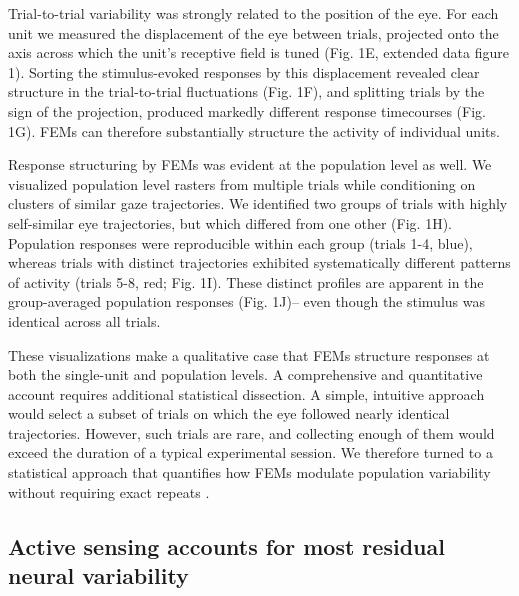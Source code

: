 \documentclass{lite}
\begin{document}
Trial-to-trial variability was strongly related to the position of the eye. For each unit we measured the displacement of the eye between trials, projected onto the axis across which the unit's receptive field is tuned (Fig. 1E, extended data figure 1). Sorting the stimulus-evoked responses by this displacement revealed clear structure in the trial-to-trial fluctuations (Fig. 1F), and splitting trials by the sign of the projection, produced markedly different response timecourses (Fig. 1G). FEMs can therefore substantially structure the activity of individual units.

Response structuring by FEMs was evident at the population level as well. We visualized population level rasters from multiple trials while conditioning on clusters of similar gaze trajectories. We identified two groups of trials with highly self-similar eye trajectories, but which differed from one other (Fig. 1H). Population responses were reproducible within each group (trials 1-4, blue), whereas trials with distinct trajectories exhibited systematically different patterns of activity (trials 5-8, red; Fig. 1I). These distinct profiles are apparent in the group-averaged population responses (Fig. 1J)-- even though the stimulus was identical across all trials. 

These visualizations make a qualitative case that FEMs structure responses at both the single-unit and population levels. A comprehensive and quantitative account requires additional statistical dissection. A simple, intuitive approach would select a subset of trials on which the eye followed nearly identical trajectories. However, such trials are rare, and collecting enough of them would exceed the duration of a typical experimental session. We therefore turned to a statistical approach that quantifies how FEMs modulate population variability without requiring exact repeats \cite{mcfarland2016variability}.



\subsection{Active sensing accounts for most residual neural variability}
\end{document}
